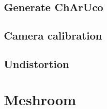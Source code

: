 \documentclass{article}
\begin{document}
    \subsection{Generate ChArUco}
        

    \subsection{Camera calibration}
        

    \subsection{Undistortion}
        

\section{Meshroom}
    
    
\end{document}
